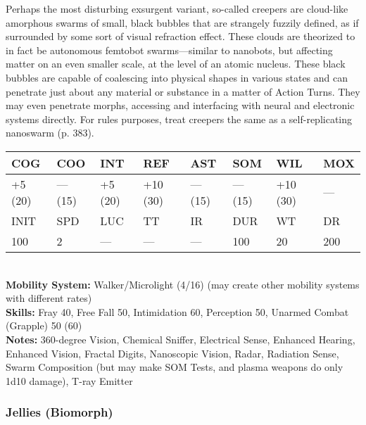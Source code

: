 Perhaps the most disturbing exsurgent variant, so-called creepers are cloud-like amorphous swarms of small, black bubbles that are strangely fuzzily defined, as if surrounded by some sort of visual refraction effect. These clouds are theorized to in fact be autonomous femtobot swarms—similar to nanobots, but affecting matter on an even smaller scale, at the level of an atomic nucleus. These black bubbles are capable of coalescing into physical shapes in various states and can penetrate just about any material or substance in a matter of Action Turns. They may even penetrate morphs, accessing and interfacing with neural and electronic systems directly. For rules purposes, treat creepers the same as a self-replicating nanoswarm (p. 383).\\ \begin{tabular}{|l|l|l|l|l|l|l|l|} \hline

COG &COO &INT &REF &AST &SOM &WIL &MOX \\ \hline

+5 (20) &— (15) &+5 (20) &+10 (30) &— (15) &— (15) &+10 (30) &— \\ \hline

INIT &SPD &LUC &TT &IR &DUR &WT &DR \\ \hline

100 &2 &— &— &— &100 &20 &200 \\ \hline

\end{tabular} \\ \textbf{Mobility System: }Walker/Microlight (4/16) (may create other mobility systems with different rates) \\ \textbf{Skills:} Fray 40, Free Fall 50, Intimidation 60, Perception 50, Unarmed Combat (Grapple) 50 (60) \\ \textbf{Notes: }360-degree Vision, Chemical Sniffer, Electrical Sense, Enhanced Hearing, Enhanced Vision, Fractal Digits, Nanoscopic Vision, Radar, Radiation Sense, Swarm Composition (but may make SOM Tests, and plasma weapons do only 1d10 damage), T-ray Emitter 







\subsubsection{Jellies (Biomorph)} 

